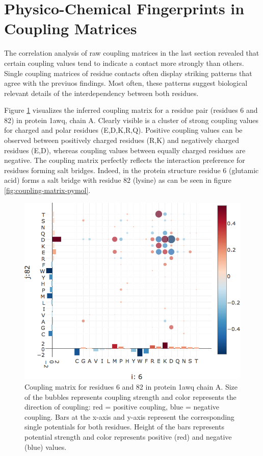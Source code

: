 \documentclass[12pt,a4paper,twoside]{book}
\theoremstyle{definition}
\theoremstyle{definition}
\theoremstyle{remark}
\begin{document}
\section{Physico-Chemical Fingerprints in Coupling
Matrices}\label{physico-chemical-fingerprints-in-coupling-matrices}

The correlation analysis of raw coupling matrices in the last section
revealed that certain coupling values tend to indicate a contact more
strongly than others. Single coupling matrices of residue contacts often
display striking patterns that agree with the previuos findings. Most
often, these patterns suggest biological relevant details of the
interdependency between both residues.

Figure \ref{fig:coupling-matrix-ionic-interaction} visualizes the
inferred coupling matrix for a residue pair (residues 6 and 82) in
protein 1awq, chain A. Clearly visible is a cluster of strong coupling
values for charged and polar residues (E,D,K,R,Q). Positive coupling
values can be observed between positively charged residues (R,K) and
negatively charged residues (E,D), whereas coupling values between
equally charged residues are negative. The coupling matrix perfectly
reflects the interaction preference for residues forming salt bridges.
Indeed, in the protein structure residue 6 (glutamic acid) forms a salt
bridge with residue 82 (lysine) as can be seen in figure
\ref{fig:coupling-matrix-pymol}.









\begin{figure}
\includegraphics[width=0.9\linewidth]{img/coupling_matrix_analysis/coupling_matrix_1a9xA05_6_82_notitle} \caption{Coupling matrix for
residues 6 and 82 in protein 1awq chain A. Size of the bubbles
represents coupling strength and color represents the direction of
coupling: red = positive coupling, blue = negative coupling. Bars at the
x-axis and y-axis represent the corresponding single potentials for both
residues. Height of the bars represents potential strength and color
represents positive (red) and negative (blue) values.}\label{fig:coupling-matrix-ionic-interaction}
\end{figure}
\end{document}
